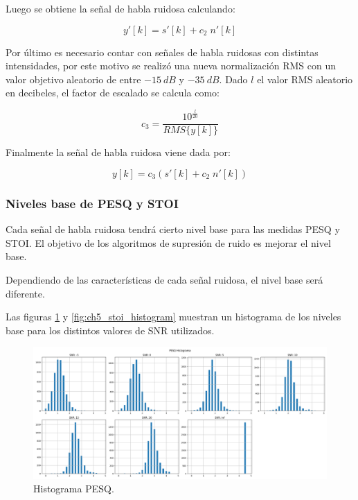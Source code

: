 Luego se obtiene la señal de habla ruidosa calculando:

\begin{equation*}
	y'[k] = s'[k] + c_2 \; n'[k]
\end{equation*}

Por último es necesario contar con señales de habla ruidosas con distintas intensidades, por este motivo se realizó una nueva normalización RMS con un valor objetivo aleatorio de entre $\SI{-15}{dB}$ y $\SI{-35}{dB}$. Dado $l$ el valor RMS aleatorio en decibeles, el factor de escalado se calcula como:

\begin{equation*}
	c_3 = \frac{10^{\frac{l}{20}}}{RMS\{y[k]\}}
\end{equation*}

Finalmente la señal de habla ruidosa viene dada por:

\begin{equation*}
	y[k] = c_3 \left( s'[k] + c_2 \; n'[k] \right)
\end{equation*}

\subsubsection{Niveles base de PESQ y STOI}

Cada señal de habla ruidosa tendrá cierto nivel base para las medidas PESQ y STOI. El objetivo de los algoritmos de supresión de ruido es mejorar el nivel base.

Dependiendo de las características de cada señal ruidosa, el nivel base será diferente.

Las figuras \ref{fig:ch5_pesq_histogram} y \ref{fig:ch5_stoi_histogram} muestran un histograma de los niveles base para los distintos valores de SNR utilizados.

\begin{figure}[H]
	\centering
	\centerline{\includegraphics[scale=0.35]{images/ch5/pesq_aggregated.png}}
	\caption{Histograma PESQ.}
	\label{fig:ch5_pesq_histogram}
\end{figure}

